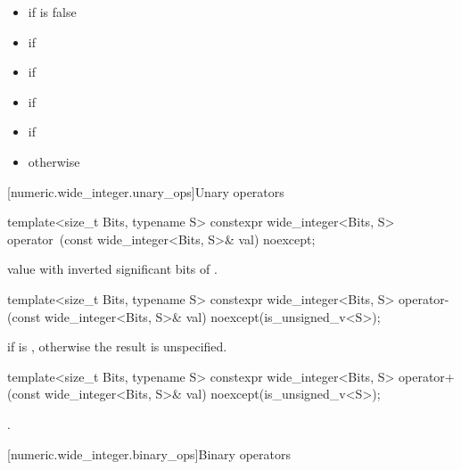\begin{itemize}
\item {} if  is false
\item {} if 
\item {} if 
\item {} if 
\item {} if 
\item {} otherwise
\end{itemize}

[numeric.wide_integer.unary_ops]{Unary operators}

\begin{itemdecl}
template<size_t Bits, typename S>
  constexpr wide_integer<Bits, S> operator~(const wide_integer<Bits, S>& val) noexcept;
\end{itemdecl}

\begin{itemdescr}
\returns value with inverted significant bits of .
\end{itemdescr}

\begin{itemdecl}
template<size_t Bits, typename S>
  constexpr wide_integer<Bits, S> operator-(const wide_integer<Bits, S>& val) noexcept(is_unsigned_v<S>);
\end{itemdecl}

\begin{itemdescr}
\returns {} if  is , otherwise the result is unspecified.
\end{itemdescr}

\begin{itemdecl}
template<size_t Bits, typename S> 
  constexpr wide_integer<Bits, S> operator+(const wide_integer<Bits, S>& val) noexcept(is_unsigned_v<S>);
\end{itemdecl}

\begin{itemdescr}
\returns {}.
\end{itemdescr}

[numeric.wide_integer.binary_ops]{Binary operators}

